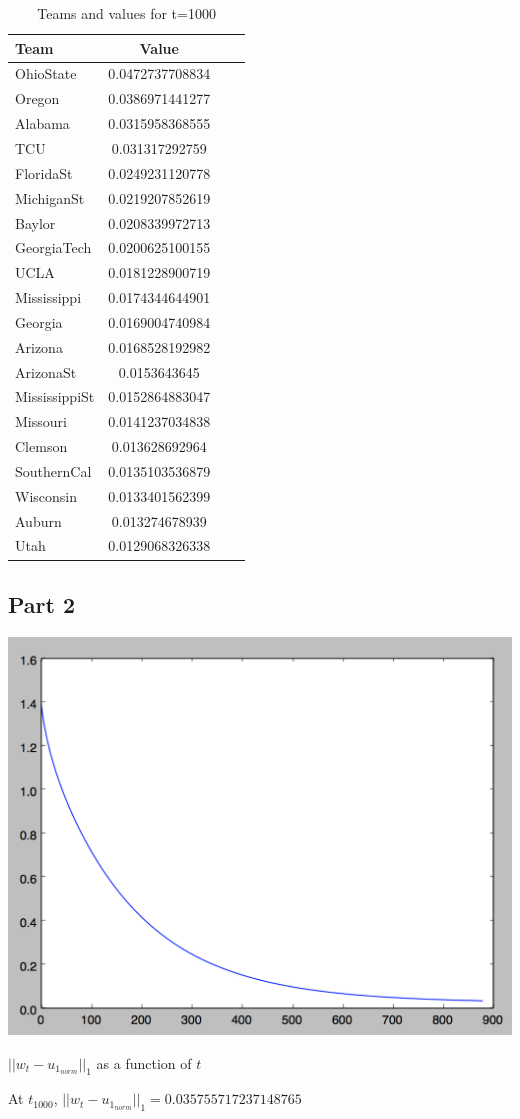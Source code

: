 \documentclass[11pt]{article}
\begin{document}
\begin{table}[!th]
\centering
\begin{tabular}{|l|c|cl}
\hline
Team & Value \\
\hline
OhioState & 0.0472737708834 \\
Oregon & 0.0386971441277 \\
Alabama & 0.0315958368555 \\
TCU & 0.031317292759 \\
FloridaSt & 0.0249231120778 \\
MichiganSt & 0.0219207852619 \\
Baylor & 0.0208339972713 \\
GeorgiaTech & 0.0200625100155 \\
UCLA & 0.0181228900719 \\
Mississippi & 0.0174344644901 \\
Georgia & 0.0169004740984 \\
Arizona & 0.0168528192982 \\
ArizonaSt & 0.0153643645 \\
MississippiSt & 0.0152864883047 \\
Missouri & 0.0141237034838 \\
Clemson & 0.013628692964 \\
SouthernCal & 0.0135103536879 \\
Wisconsin & 0.0133401562399 \\
Auburn & 0.013274678939 \\
Utah & 0.0129068326338 \\
\hline
\end{tabular}
\caption{Teams and values for t=1000}
\label{ex:table}
\end{table}

\subsection*{Part 2}

\includegraphics[scale=.5]{images/mm_eigdiff}

$||w_t - u_{1_{norm}}||_1$ as a function of $t$

At $t_1000$, $||w_t - u_{1_{norm}}||_1 =  0.035755717237148765$
\end{document}
